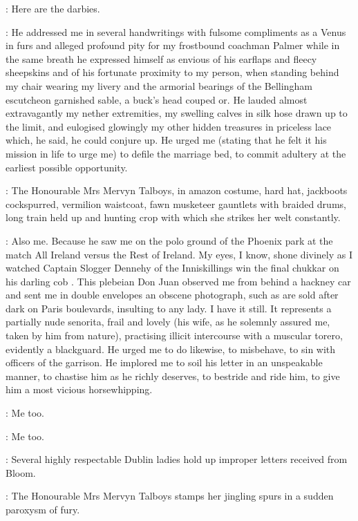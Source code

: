 \SecondWatch:
Here are the darbies.

\Bellingham:
He addressed me in several handwritings with fulsome compliments
as a Venus in furs and alleged profound pity for my frostbound coachman Palmer
while in the same breath he expressed himself
as envious of his earflaps and fleecy sheepskins
and of his fortunate proximity to my person,
when standing behind my chair wearing my livery
and the armorial bearings of the Bellingham escutcheon garnished sable,
a buck's head couped or.
He lauded almost extravagantly my nether extremities,
my swelling calves in silk hose drawn up to the limit,
and eulogised glowingly my other hidden treasures in priceless lace
which, he said, he could conjure up.
He urged me (stating that he felt it his mission in life to urge me)
to defile the marriage bed, to commit adultery at the earliest possible opportunity.

:
The Honourable Mrs Mervyn Talboys, in amazon costume, hard hat,
jackboots cockspurred, vermilion waistcoat,
fawn musketeer gauntlets with braided drums, long train held up
and hunting crop with which she strikes her welt constantly.

\Talboys:
Also me.
Because he saw me on the polo ground of the Phoenix park
at the match All Ireland versus the Rest of Ireland.
My eyes, I know, shone divinely as I watched Captain Slogger Dennehy
of the Inniskillings win the final chukkar on his darling cob .
This plebeian Don Juan observed me from behind a hackney car
and sent me in double envelopes an obscene photograph,
such as are sold after dark on Paris boulevards, insulting to any lady.
I have it still.
It represents a partially nude senorita, frail and lovely
(his wife, as he solemnly assured me, taken by him from nature),
practising illicit intercourse with a muscular torero, evidently a blackguard.
He urged me to do likewise, to misbehave, to sin with officers of the garrison.
He implored me to soil his letter in an unspeakable manner,
to chastise him as he richly deserves, to bestride and ride him,
to give him a most vicious horsewhipping.

\Bellingham:
Me too.

\Yelverton:
Me too.

:
Several highly respectable Dublin ladies hold up improper letters
received from Bloom.

:
The Honourable Mrs Mervyn Talboys stamps her jingling spurs
in a sudden paroxysm of fury.

